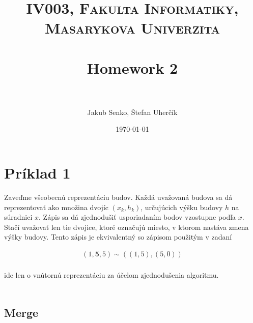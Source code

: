 \documentclass[paper=a4, fontsize=11pt]{scrartcl} %
\title{	
\normalfont \normalsize 
\textsc{IV003, Fakulta Informatiky, Masarykova Univerzita} \\ [25pt] %
\horrule{0.5pt} \\[0.4cm] %
\huge Homework 2 \\ %
\horrule{2pt} \\[0.5cm] %
}
\author{Jakub Senko, Štefan Uherčík} %
\date{\normalsize\today} %
\numberwithin{equation}{section} %
\numberwithin{figure}{section} %
\numberwithin{table}{section} %
\begin{document}
\maketitle %


\section*{Príklad 1}

Zaveďme všeobecnú reprezentáciu budov. Každá uvažovaná budova sa dá reprezentovať ako množina dvojíc $(x_k, h_k)$, určujúcich výšku budovy $h$ na súradnici $x$. Zápis sa dá zjednodušiť usporiadaním bodov vzostupne podľa $x$. Stačí uvažovať len tie dvojice, ktoré označujú miesto, v ktorom nastáva zmena výšky budovy. Tento zápis je ekvivalentný so zápisom použitým v zadaní

\begin{equation}
    \begin{aligned}
        (1, \boldsymbol{5}, 5) \sim ((1, 5), (5, 0)) \\
    \end{aligned}
\end{equation}

ide len o vnútornú reprezentáciu za účelom zjednodušenia algoritmu. \\
\\

\subsection*{Merge}
\end{document}
